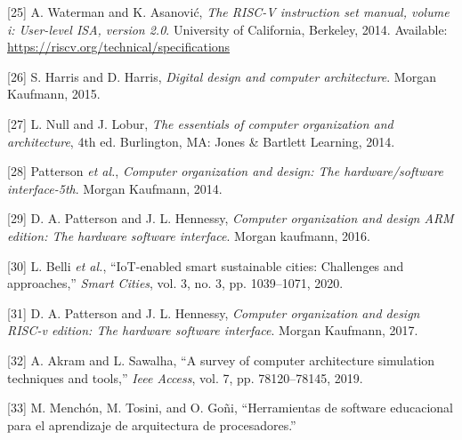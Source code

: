 \documentclass[12pt,oneside]{templates/unerthesis}
\newcommand{\CSLLeftMargin}[1]{#1} %
\newcommand{\CSLRightInline}[1]{#1} %
\newlength{\cslhangindent}
\newenvironment{CSLReferences}[2] %
 {\setlength{\parindent}{0pt}%
  \setlength{\leftskip}{#1 pt\relax}%
  \setlength{\parskip}{#2 pt\relax}%
  \everypar{\setlength{\hangindent}{\cslhangindent}}}
 {\par}
\begin{document}
\begin{CSLReferences}{0}{0}
\leavevmode{}%
\CSLLeftMargin{{[}25{]} }%
\CSLRightInline{A. Waterman and K. Asanović, \emph{The {RISC}-{V} instruction set manual, volume i: User-level ISA, version 2.0}. University of California, Berkeley, 2014. Available: \url{https://riscv.org/technical/specifications}}

\leavevmode{}%
\CSLLeftMargin{{[}26{]} }%
\CSLRightInline{S. Harris and D. Harris, \emph{Digital design and computer architecture}. Morgan Kaufmann, 2015.}

\leavevmode{}%
\CSLLeftMargin{{[}27{]} }%
\CSLRightInline{L. Null and J. Lobur, \emph{The essentials of computer organization and architecture}, 4th ed. Burlington, MA: Jones \& Bartlett Learning, 2014.}

\leavevmode{}%
\CSLLeftMargin{{[}28{]} }%
\CSLRightInline{Patterson \emph{et al.}, \emph{Computer organization and design: The hardware/software interface-5th}. Morgan Kaufmann, 2014.}

\leavevmode{}%
\CSLLeftMargin{{[}29{]} }%
\CSLRightInline{D. A. Patterson and J. L. Hennessy, \emph{Computer organization and design ARM edition: The hardware software interface}. Morgan kaufmann, 2016.}

\leavevmode{}%
\CSLLeftMargin{{[}30{]} }%
\CSLRightInline{L. Belli \emph{et al.}, {``IoT-enabled smart sustainable cities: Challenges and approaches,''} \emph{Smart Cities}, vol. 3, no. 3, pp. 1039--1071, 2020.}

\leavevmode{}%
\CSLLeftMargin{{[}31{]} }%
\CSLRightInline{D. A. Patterson and J. L. Hennessy, \emph{Computer organization and design RISC-v edition: The hardware software interface}. Morgan Kaufmann, 2017.}

\leavevmode{}%
\CSLLeftMargin{{[}32{]} }%
\CSLRightInline{A. Akram and L. Sawalha, {``A survey of computer architecture simulation techniques and tools,''} \emph{Ieee Access}, vol. 7, pp. 78120--78145, 2019.}

\leavevmode{}%
\CSLLeftMargin{{[}33{]} }%
\CSLRightInline{M. Menchón, M. Tosini, and O. Goñi, {``Herramientas de software educacional para el aprendizaje de arquitectura de procesadores.''}}


\end{CSLReferences}
\end{document}
